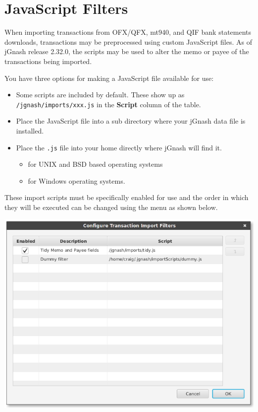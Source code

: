 \documentclass[letterpaper,12pt]{book}
\begin{document}
    \section{JavaScript Filters}
    When importing transactions from OFX/QFX, mt940, and QIF bank statements
    downloads, transactions may be preprocessed using custom JavaScript files. As
    of jGnash release 2.32.0, the scripts may be used to alter the memo or payee of
    the transactions being imported.

    You have three options for making a JavaScript file available for use:
    \begin{itemize}
        \item Some scripts are included by default. These show up as \texttt{/jgnash/imports/xxx.js}
        in the \textbf{Script} column of the table.
        \item Place the JavaScript file into a  sub directory where
        your jGnash data file is installed.
        \item Place the \texttt{.js} file into your home directly where jGnash will find it.
        \begin{itemize}
            \item {} for UNIX and BSD based operating systems
            \item {} for Windows operating systems.
        \end{itemize}
    \end{itemize}

    These import scripts must be specifically enabled for use and the order in which they will be executed can be changed
    using the  menu as shown below.

    \includegraphics[width=0.9\linewidth]{images/importFilters}
\end{document}
